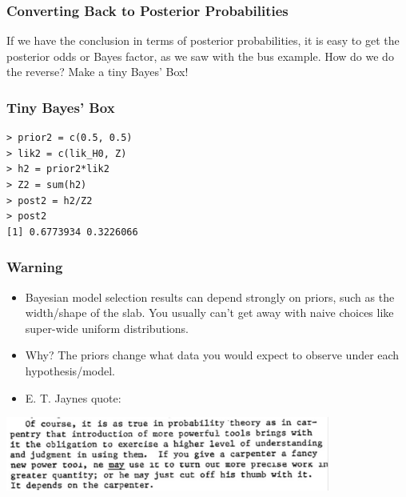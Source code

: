 \documentclass{beamer}
\begin{document}
\begin{frame}[fragile]
\frametitle{Converting Back to Posterior Probabilities}
If we have the conclusion in terms of posterior probabilities, it is easy
to get the posterior odds or Bayes factor, as we saw with the bus example.
How do we do the reverse? Make a tiny Bayes' Box!

\end{frame}

\begin{frame}[fragile]
\frametitle{Tiny Bayes' Box}

\begin{verbatim}
> prior2 = c(0.5, 0.5)
> lik2 = c(lik_H0, Z)
> h2 = prior2*lik2
> Z2 = sum(h2)
> post2 = h2/Z2
> post2
[1] 0.6773934 0.3226066
\end{verbatim}


\end{frame}

\begin{frame}
\frametitle{Warning}

\begin{itemize}
\item Bayesian model selection results
can depend strongly on priors, such as the width/shape of the slab. You usually
can't get away with naive choices like super-wide uniform distributions.\pause
\item Why? The priors change what data you would expect to observe under each
hypothesis/model.\pause
\item E. T. Jaynes quote:
\end{itemize}

\includegraphics[width=0.8\textwidth]{images/carpenter.png}

\end{frame}
\end{document}
